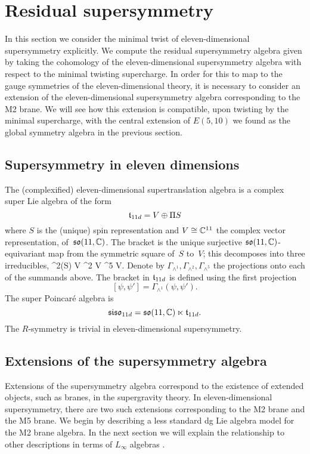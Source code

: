 \section{Residual supersymmetry} 
\label{sec:susy}

In this section we consider the minimal twist of eleven-dimensional supersymmetry explicitly. 
We compute the residual supersymmetry algebra given by taking the cohomology of the eleven-dimensional supersymmetry algebra with respect to the minimal twisting supercharge. 
In order for this to map to the gauge symmetries of the eleven-dimensional theory, it is necessary to consider an extension of the eleven-dimensional supersymmetry algebra corresponding to the M2 brane.
We will see how this extension is compatible, upon twisting by the minimal supercharge, with the central extension of $E(5,10)$ we found as the global symmetry algebra in the previous section. 


\subsection{Supersymmetry in eleven dimensions}
\label{sec:11dsusy}

The (complexified) eleven-dimensional supertranslation algebra is a complex super Lie algebra of the form
\[
  \mathfrak t_{11d} = V \oplus \Pi S
\]
where $S$ is the (unique) spin representation and $V \cong \mathbb C^{11}$ the complex vector representation, of~$\mathfrak{so}(11, \mathbb C)$. 
The bracket is the unique surjective $\mathfrak{so}(11,\mathbb C)$-equivariant map from the symmetric square of~$S$ to~$V$;
this decomposes into three irreducibles, 
\beqn\label{eqn:decomp}
  \Sym^2(S) \cong V \oplus \wedge^2 V \oplus \wedge^5 V.
\eeqn
Denote by $\Gamma_{\wedge^1}, \Gamma_{\wedge^2}, \Gamma_{\wedge^5}$ the projections onto each of the summands above. 
The bracket in $\mathfrak t_{11d}$ is defined using the first projection
\[
[\psi, \psi'] = \Gamma_{\wedge^1} (\psi, \psi') .
\]
The super Poincar\'{e} algebra is
\[
  \mathfrak{siso}_{11d} = \mathfrak{so}(11 , \mathbb C) \ltimes \mathfrak t_{11d} .
\]
The $R$-symmetry is trivial in eleven-dimensional supersymmetry. 

\subsection{Extensions of the supersymmetry algebra} 
\label{sec:m2brane}

Extensions of the supersymmetry algebra correspond to the existence of extended objects, such as branes, in the supergravity theory.
In eleven-dimensional supersymmetry, there are two such extensions corresponding to the M2 brane and the M5 brane.
We begin by describing a less standard dg Lie algebra model for the M2 brane algebra.
In the next section we will explain the relationship to other descriptions in terms of $L_\infty$ algebras \cite{Basu_2005,Bagger_2007,fiorenza2015super}. 

